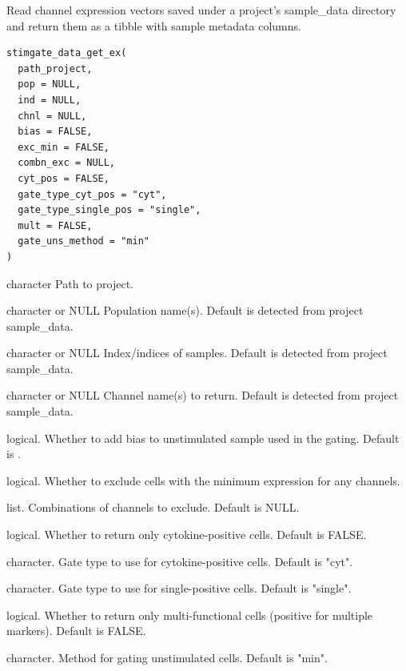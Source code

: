 \documentclass[letterpaper]{book}
\begin{document}
%
\begin{Description}
Read channel expression vectors saved under a project's sample\_data
directory and return them as a tibble with sample metadata columns.
\end{Description}
%
\begin{Usage}
\begin{verbatim}
stimgate_data_get_ex(
  path_project,
  pop = NULL,
  ind = NULL,
  chnl = NULL,
  bias = FALSE,
  exc_min = FALSE,
  combn_exc = NULL,
  cyt_pos = FALSE,
  gate_type_cyt_pos = "cyt",
  gate_type_single_pos = "single",
  mult = FALSE,
  gate_uns_method = "min"
)
\end{verbatim}
\end{Usage}
%
\begin{Arguments}
\begin{ldescription}
\item[\code{path\_project}] character Path to project.

\item[\code{pop}] character or NULL Population name(s). Default is detected from project sample\_data.

\item[\code{ind}] character or NULL Index/indices of samples. Default is detected from project sample\_data.

\item[\code{chnl}] character or NULL Channel name(s) to return. Default is detected from project sample\_data.

\item[\code{bias}] logical. Whether to add bias to unstimulated sample used in the gating. Default is .

\item[\code{exc\_min}] logical. Whether to exclude cells with the minimum expression for any channels.

\item[\code{combn\_exc}] list. Combinations of channels to exclude. Default is NULL.

\item[\code{cyt\_pos}] logical. Whether to return only cytokine-positive cells. Default is FALSE.

\item[\code{gate\_type\_cyt\_pos}] character. Gate type to use for cytokine-positive cells. Default is "cyt".

\item[\code{gate\_type\_single\_pos}] character. Gate type to use for single-positive cells. Default is "single".

\item[\code{mult}] logical. Whether to return only multi-functional cells (positive for multiple markers). Default is FALSE.

\item[\code{gate\_uns\_method}] character. Method for gating unstimulated cells. Default is "min".
\end{ldescription}
\end{Arguments}
\end{document}
